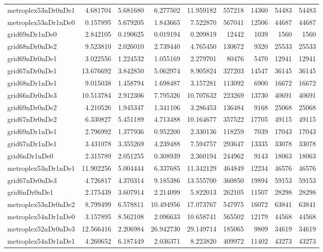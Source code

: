 \begin{longtable}{|l|r|r|r|r|r|r|r|r|}
metroplex53nDr0nDe1 & 4.681704 & 5.681680 & 6.277502 & 11.959182 & 557218 & 14360 & 54483 & 54483 \\
metroplex53nDr1nDe0 & 0.157895 & 5.679205 & 1.843665 & 7.522870 & 567041 & 12506 & 44687 & 44687 \\
grid69nDr1nDe0 & 2.842105 & 0.190625 & 0.019194 & 0.209819 & 12442 & 1039 & 1560 & 1560 \\
grid68nDr0nDe2 & 9.523810 & 2.026010 & 2.739440 & 4.765450 & 130672 & 9320 & 25533 & 25533 \\
grid69nDr0nDe1 & 3.022556 & 1.224532 & 1.055169 & 2.279701 & 80476 & 5470 & 12941 & 12941 \\
grid67nDr0nDe1 & 13.676692 & 3.842850 & 5.062974 & 8.905824 & 327203 & 14547 & 36145 & 36145 \\
grid68nDr1nDe1 & 9.015038 & 1.458794 & 1.698487 & 3.157281 & 113092 & 6900 & 16672 & 16672 \\
grid66nDr0nDe3 & 10.513784 & 2.912306 & 7.795326 & 10.707632 & 223269 & 13730 & 40691 & 40691 \\
grid69nDr0nDe2 & 4.210526 & 1.945347 & 1.341106 & 3.286453 & 136484 & 9168 & 25068 & 25068 \\
grid67nDr0nDe2 & 6.330827 & 5.451189 & 4.713488 & 10.164677 & 357522 & 17705 & 49115 & 49115 \\
grid69nDr1nDe1 & 2.796992 & 1.377936 & 0.952200 & 2.330136 & 118259 & 7039 & 17043 & 17043 \\
grid67nDr1nDe1 & 3.431078 & 3.355269 & 4.239488 & 7.594757 & 293647 & 13335 & 33078 & 33078 \\
grid6nDr1nDe0 & 2.315789 & 2.051255 & 0.308939 & 2.360194 & 244962 & 9143 & 18063 & 18063 \\
metroplex53nDr1nDe1 & 11.902256 & 5.004444 & 6.337685 & 11.342129 & 464849 & 12234 & 46576 & 46576 \\
grid67nDr0nDe3 & 4.726817 & 4.370314 & 9.185386 & 13.555700 & 360850 & 19894 & 59153 & 59153 \\
grid6nDr0nDe1 & 2.175439 & 3.607914 & 2.214099 & 5.822013 & 262105 & 11507 & 28298 & 28298 \\
metroplex53nDr0nDe2 & 8.799499 & 6.578811 & 10.494956 & 17.073767 & 547975 & 16072 & 63841 & 63841 \\
metroplex54nDr1nDe0 & 3.157895 & 8.562108 & 2.096633 & 10.658741 & 565502 & 12179 & 44568 & 44568 \\
metroplex52nDr0nDe3 & 12.566416 & 2.206984 & 26.942730 & 29.149714 & 185065 & 9809 & 34619 & 34619 \\
metroplex54nDr1nDe1 & 4.260652 & 6.187449 & 2.036371 & 8.223820 & 409972 & 11402 & 43273 & 43273 \\

\end{longtable}
